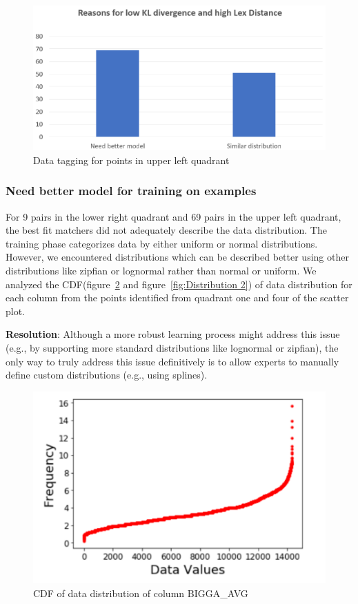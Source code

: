 \begin{figure}
	\centering
	\includegraphics[width=0.8\columnwidth]{graphics/Upper_left_quad}
	\caption{Data tagging for points in upper left quadrant}
	\label{fig:datatags:upperleft}
\end{figure}

\subsubsection{Need better model for training on examples}
For 9 pairs in the lower right quadrant and 69 pairs in the upper left quadrant, the best fit matchers did not adequately describe the data distribution.
The training phase categorizes data by either uniform or normal distributions. 
However, we encountered distributions which can be described better using other distributions like zipfian or lognormal rather than normal or uniform.
We analyzed the CDF(figure~\ref{fig:Distribution 1} and figure~\ref{fig:Distribution 2}) of data distribution for each column from the points identified from quadrant one and four of the scatter plot. 

\textbf{Resolution}: Although a more robust learning process might address this issue (e.g., by supporting more standard distributions like lognormal or zipfian), the only way to truly address this issue definitively is to allow experts to manually define custom distributions (e.g., using splines).

\begin{figure}[H]
	\centering
	\includegraphics[width=0.8\columnwidth]{graphics/Challenge1_1}
	\caption{CDF of data distribution of column BIGGA\_AVG}
	\label{fig:Distribution 1}
\end{figure}

